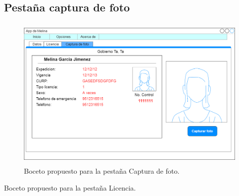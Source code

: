 		\subsection{Pestaña captura de foto}
			\begin{figure}[h]
			\centering
				\includegraphics[height=7.5cm]{img/gui_foto}
				\caption{Boceto propuesto para la pestaña Captura de foto.}		
				\label{Pestaña Licencia}
			\end{figure}
			Boceto propuesto para la pestaña Licencia.	